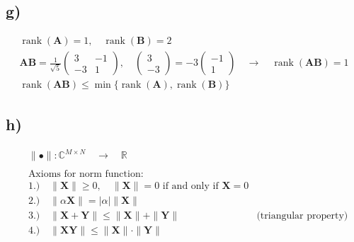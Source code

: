 \documentclass[fleqn]{article}
\DeclareMathOperator{\rank}{rank}
\begin{document}
\subsection*{g) }
\begin{align*}
	&\rank\left(\mathbf{A}\right)=1,\quad\rank\left(\mathbf{B}\right)=2& \\
	&\mathbf{AB}=\frac{1}{\sqrt{5}}
	\begin{pmatrix}
	3 & -1 \\
	-3 & 1
	\end{pmatrix},\quad
	\begin{pmatrix}3\\-3\end{pmatrix}=-3\begin{pmatrix}-1\\1\end{pmatrix}\quad\rightarrow\quad\rank\left(\mathbf{AB}\right)=1& \\
	&\rank\left(\mathbf{AB}\right)\le\min\{\rank\left(\mathbf{A}\right), \rank\left(\mathbf{B}\right)\}&
\end{align*}

\subsection*{h) }
\begin{align*}
	&\|\bullet\|: \mathbb{C}^{M\times N}\quad\rightarrow\quad\mathbb{R}& \\\\
	&\text{Axioms for norm function:}&\\
	&1.)\quad\|\mathbf{X}\|\ge 0,\quad\|\mathbf{X}\|=0 \text{ if and only if }\mathbf{X}=0& \\
	&2.)\quad\|\alpha\mathbf{X}\|=\left|\alpha\right|\|\mathbf{X}\|& \\
	&3.)\quad\|\mathbf{X+Y}\|\le\|\mathbf{X}\|+\|\mathbf{Y}\|& \text{(triangular property)} \\
	&4.)\quad\|\mathbf{XY}\|\le\|\mathbf{X}\|\cdot\|\mathbf{Y}\|&
\end{align*}
\end{document}
